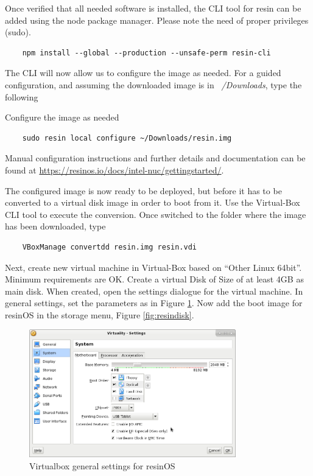 \documentclass[]{scrartcl}
\begin{document}
Once verified that all needed software is installed, the CLI tool for resin can be added using the node package manager. Please note the need of proper privileges (sudo).

\begin{verbatim}
	npm install --global --production --unsafe-perm resin-cli
\end{verbatim}

The CLI will now allow us to configure the image as needed. For a guided configuration, and assuming the downloaded image is in \textit{~/Downloads}, type the following 

Configure the image as needed
\begin{verbatim}
	sudo resin local configure ~/Downloads/resin.img
\end{verbatim}

Manual configuration instructions and further details and documentation can be found at \url{https://resinos.io/docs/intel-nuc/gettingstarted/}.

The configured image is now ready to be deployed, but before it has to be converted to a virtual disk image in order to boot from it. Use the Virtual-Box CLI tool to execute the conversion. Once switched to the folder where the image has been downloaded, type
\begin{verbatim}
	VBoxManage convertdd resin.img resin.vdi
\end{verbatim}

Next, create new virtual machine in Virtual-Box based on ``Other Linux 64bit''. Minimum requirements are OK. Create a virtual Disk of Size of at least 4GB as main disk. 
When created, open the settings dialogue for the virtual machine. In general settings, set the parameters as in Figure \ref{fig:resingen}. Now add the boot image for resinOS in the storage menu, Figure \ref{fig:resindisk}.

\begin{figure}[t]
	\centering
	\includegraphics[width=0.8\textwidth]{resin-vbox}
	\caption{Virtualbox general settings for resinOS}
	\label{fig:resingen}
\end{figure}
\end{document}
